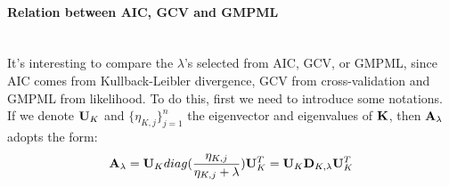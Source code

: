 \documentclass[11pt]{article}
\begin{document}
\paragraph{Relation between AIC, GCV and GMPML}\mbox{}\\
It's interesting to compare the $\lambda$'s selected from AIC, GCV, or GMPML, since AIC comes from Kullback-Leibler divergence, GCV from cross-validation and GMPML from likelihood. To do this, first we need to introduce some notations.\\
If we denote ${\bf U}_K$ and $\{\eta_{K, j}\}_{j=1}^n$ the eigenvector and eigenvalues of ${\bf K}$, then ${\bf A}_\lambda$ adopts the form:
\begin{align*}
{\bf A}_\lambda={\bf U}_K diag(\frac{\eta_{K, j}}{\eta_{K, j}+\lambda}){\bf U}_K^T={\bf U}_K {\bf D}_{K,\lambda}{\bf U}_K^T
\end{align*}

\end{document}
